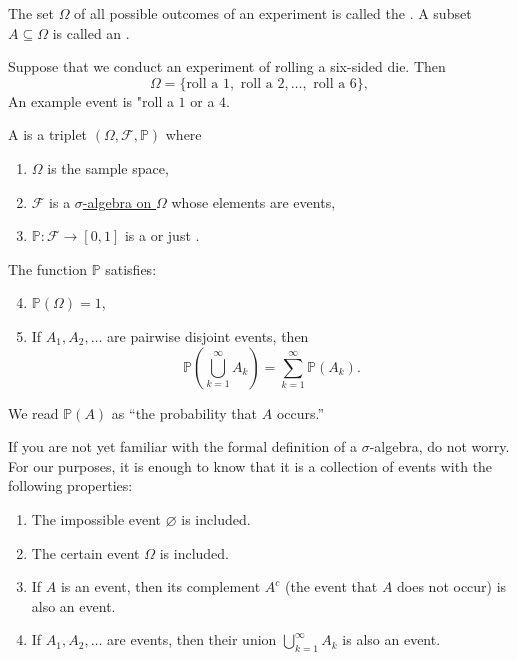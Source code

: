 \begin{dfn}
    The set \( \Omega \) of all possible outcomes of an experiment is called the .  
    A subset \( A \subseteq \Omega \) is called an .
\end{dfn}

\begin{example}
    Suppose that we conduct an experiment of rolling a six-sided die. Then 
    \[ \Omega = \{\text{roll a }1,\text{ roll a }2,\dots,\text{ roll a }6\},\]
    An example event is "roll a \( 1 \) or a \( 4 \).
\end{example}


\begin{dfn}
    A  is a triplet \( (\Omega, \mathscr{F}, \mathbb{P}) \) where
    \begin{enumerate}[label=\textbf{\roman*)}]
        \item \( \Omega \) is the sample space,
        \item \( \mathscr{F} \) is a \hyperref[def:sigma-algebra]{\( \sigma \)-algebra on \( \Omega \)} whose elements are events,
        \item \( \mathbb{P} : \mathscr{F} \to [0,1] \) is a  or just . 
    \end{enumerate}
    The function \( \mathbb{P} \) satisfies:
    \begin{enumerate}[label=\textbf{\roman*)}]
        \setcounter{enumi}{3}
        \item \( \mathbb{P}(\Omega) = 1 \),
        \item If \( A_1, A_2, \dots \) are pairwise disjoint events, then
        \[
        \mathbb{P}\!\left( \bigcup_{k=1}^{\infty} A_k \right)
        = \sum_{k=1}^{\infty} \mathbb{P}(A_k).
        \]
    \end{enumerate}
    We read \( \mathbb{P}(A) \) as “the probability that \( A \) occurs.”
\end{dfn}



If you are not yet familiar with the formal definition of a \( \sigma \)-algebra, do not worry.  
For our purposes, it is enough to know that it is a collection of events with the following properties:

\begin{enumerate}[label=\textbf{\roman*)}]
    \item The impossible event \( \varnothing \) is included.
    \item The certain event \( \Omega \) is included.
    \item If \( A \) is an event, then its complement \( A^c \) (the event that \( A \) does not occur) is also an event.
    \item If \( A_1, A_2, \dots \) are events, then their union \( \bigcup_{k=1}^{\infty} A_k \) is also an event.
\end{enumerate}


